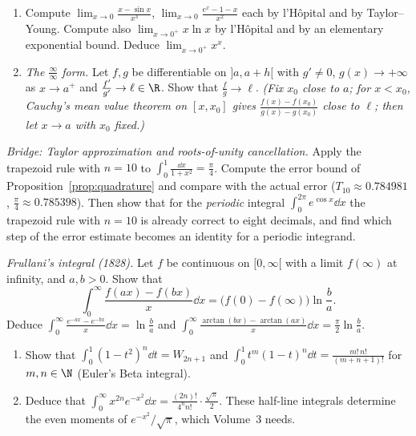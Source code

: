 \begin{exercise}[$\star\star$]\label{ex:lhopital}
\begin{enumerate}[label=(\alph*)]
\item Compute $\lim_{x\to0}\frac{x-\sin x}{x^3}$, $\lim_{x\to0}\frac{e^x-1-x}{x^2}$ each by l'H\^opital and by Taylor--Young. Compute also
$\lim_{x\to0^+}x\ln x$ by l'H\^opital and by an elementary exponential bound. Deduce $\lim_{x\to0^+}x^x$.
\item \emph{The $\frac\infty\infty$ form.} Let $f,g$ be differentiable on $]a,a+h[$ with $g'\ne0$, $g(x)\to+\infty$ as $x\to a^+$ and $\frac{f'}{g'}\to\ell\in\R$. Show that $\frac fg\to\ell$. \emph{(Fix $x_0$ close to $a$; for $x<x_0$, Cauchy's mean value theorem on $[x,x_0]$ gives $\frac{f(x)-f(x_0)}{g(x)-g(x_0)}$ close to $\ell$; then let $x\to a$ with $x_0$ fixed.)}
\end{enumerate}
\end{exercise}

\begin{exercise}[$\star\star\star$]\label{ex:trapezoid}
\emph{Bridge: Taylor approximation and roots-of-unity cancellation.}
Apply the trapezoid rule with $n=10$ to $\displaystyle\int_0^1\frac{\dd x}{1+x^2}=\frac\pi4$. Compute the error bound of Proposition~\ref{prop:quadrature} and compare with the actual error ($T_{10}\approx0.784981$, $\frac\pi4\approx0.785398$). Then show that for the \emph{periodic} integral $\int_0^{2\pi}e^{\cos x}\dd x$ the trapezoid rule with $n=10$ is already correct to eight decimals, and find which step of the error estimate becomes an identity for a periodic integrand.
\end{exercise}

\begin{exercise}[$\star\star$]\label{ex:frullani}
\emph{Frullani's integral (1828).} Let $f$ be continuous on $[0,\infty[$ with a limit $f(\infty)$ at infinity, and $a,b>0$. Show that
\[
\int_0^\infty\frac{f(ax)-f(bx)}x\dd x=\bigl(f(0)-f(\infty)\bigr)\ln\frac ba.
\]
Deduce $\int_0^\infty\frac{e^{-ax}-e^{-bx}}x\dd x=\ln\frac ba$ and $\int_0^\infty\frac{\arctan(bx)-\arctan(ax)}{x}\dd x=\frac\pi2\ln\frac ba$.
\end{exercise}

\begin{exercise}[$\star\star$]\label{ex:gammahalf}
\begin{enumerate}[label=(\alph*)]
\item Show that $\displaystyle\int_0^1(1-t^2)^n\dd t=W_{2n+1}$ and $\displaystyle\int_0^1t^{m}(1-t)^{n}\dd t=\frac{m!\,n!}{(m+n+1)!}$ for $m,n\in\N$ (Euler's Beta integral).
\item Deduce that $\displaystyle\int_0^\infty x^{2n}e^{-x^2}\dd x=\frac{(2n)!}{4^nn!}\cdot\frac{\sqrt\pi}2$. These half-line integrals determine the even moments of $e^{-x^2}/\sqrt\pi$, which Volume~3 needs.
\end{enumerate}
\end{exercise}

